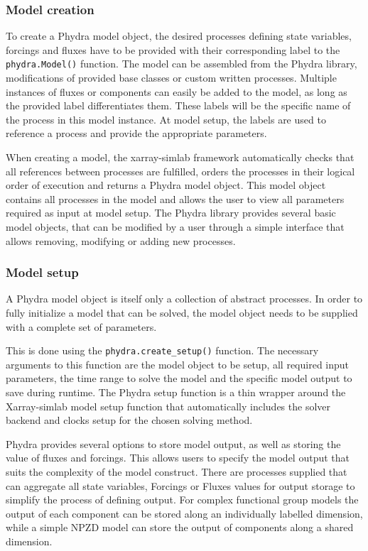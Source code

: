\documentclass[journal abbreviation, manuscript]{copernicus}
\begin{document}
\subsubsection{Model creation}

To create a Phydra model object, the desired processes defining state variables, forcings and fluxes have to be provided with their corresponding label to the \texttt{phydra.Model()} function.
The model can be assembled from the Phydra library, modifications of provided base classes or custom written processes. Multiple instances of fluxes or components can easily be added to the model, as long as the provided label differentiates them.
These labels will be the specific name of the process in this model instance. At model setup, the labels are used to reference a process and provide the appropriate parameters.

When creating a model, the xarray-simlab framework automatically checks that all references between processes are fulfilled, orders the processes in their logical order of execution and returns a Phydra model object. This model object contains all processes in the model and allows the user to view all parameters required as input at model setup. The Phydra library provides several basic model objects, that can be modified by a user through a simple interface that allows removing, modifying or adding new processes.

\subsubsection{Model setup}

A Phydra model object is itself only a collection of abstract processes. In order to fully initialize a model that can be solved, the model object needs to be supplied with a complete set of parameters.

This is done using the \texttt{phydra.create\_setup()} function. The necessary arguments to this function are the model object to be setup, all required input parameters, the time range to solve the model and the specific model output to save during runtime. The Phydra setup function is a thin wrapper around the Xarray-simlab model setup function that automatically includes the solver backend and clocks setup for the chosen solving method.

Phydra provides several options to store model output, as well as storing the value of fluxes and forcings. This allows users to specify the model output that suits the complexity of the model construct. There are processes supplied that can aggregate all state variables, Forcings or Fluxes values for output storage to simplify the process of defining output. For complex functional group models the output of each component can be stored along an individually labelled dimension, while a simple NPZD model can store the output of components along a shared dimension.
\end{document}
